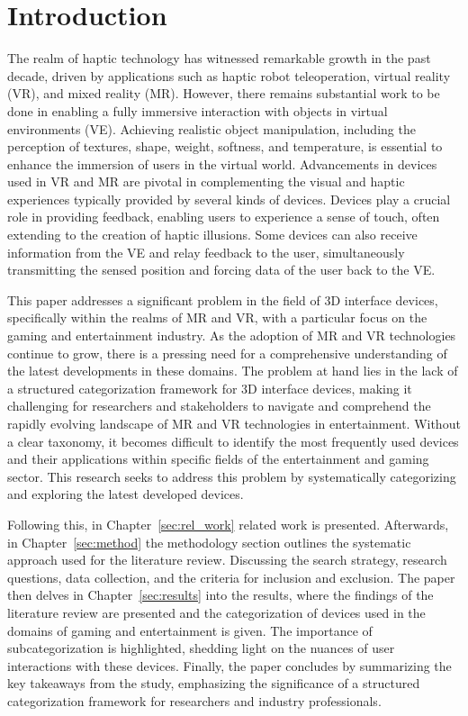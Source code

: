 \section{Introduction}
\label{intro}

The realm of haptic technology has witnessed remarkable growth in the past decade, driven by applications such as haptic robot teleoperation, virtual reality (VR), and mixed reality (MR). However, there remains substantial work to be done in enabling a fully immersive interaction with objects in virtual environments (VE). Achieving realistic object manipulation, including the perception of textures, shape, weight, softness, and temperature, is essential to enhance the immersion of users in the virtual world. Advancements in devices used in VR and MR are pivotal in complementing the visual and haptic experiences typically provided by several kinds of devices. Devices play a crucial role in providing feedback, enabling users to experience a sense of touch, often extending to the creation of haptic illusions. Some devices can also receive information from the VE and relay feedback to the user, simultaneously transmitting the sensed position and forcing data of the user back to the VE.

This paper addresses a significant problem in the field of 3D interface devices, specifically within the realms of MR and VR, with a particular focus on the gaming and entertainment industry. As the adoption of MR and VR technologies continue to grow, there is a pressing need for a comprehensive understanding of the latest developments in these domains. The problem at hand lies in the lack of a structured categorization framework for 3D interface devices, making it challenging for researchers and stakeholders to navigate and comprehend the rapidly evolving landscape of MR and VR technologies in entertainment. Without a clear taxonomy, it becomes difficult to identify the most frequently used devices and their applications within specific fields of the entertainment and gaming sector. This research seeks to address this problem by systematically categorizing and exploring the latest developed devices.

Following this, in Chapter~\ref{sec:rel_work} related work is presented. Afterwards, in Chapter~\ref{sec:method} the methodology section outlines the systematic approach used for the literature review. Discussing the search strategy, research questions, data collection, and the criteria for inclusion and exclusion. The paper then delves in Chapter~\ref{sec:results} into the results, where the findings of the literature review are presented and the categorization of devices used in the domains of gaming and entertainment is given. The importance of subcategorization is highlighted, shedding light on the nuances of user interactions with these devices. Finally, the paper concludes by summarizing the key takeaways from the study, emphasizing the significance of a structured categorization framework for researchers and industry professionals.
